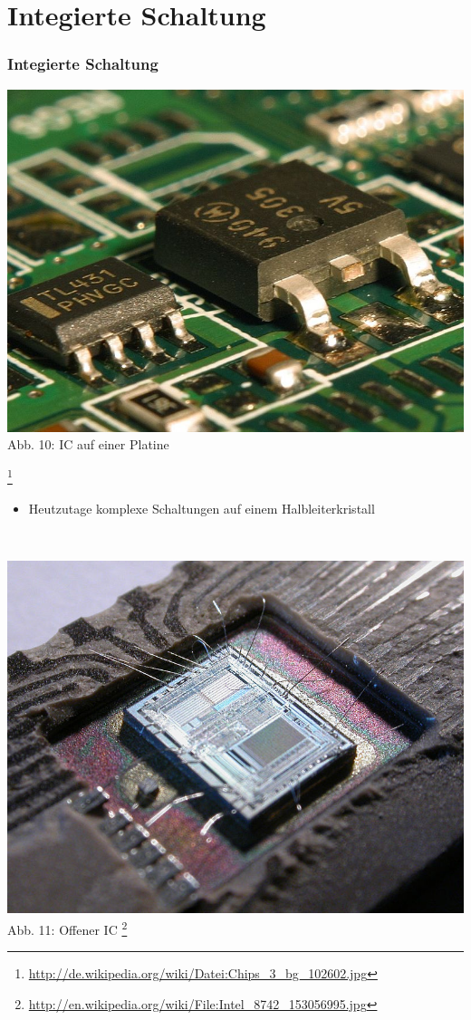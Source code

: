 \section*{Integierte Schaltung}
\begin{frame}
\frametitle{Integierte Schaltung}
\begin{minipage}{0.3\textwidth}
	\includegraphics[scale=0.15]{e13/IC.jpg}\\
	Abb. 10: IC auf einer Platine
\end{minipage}
\footnote{\url{http://de.wikipedia.org/wiki/Datei:Chips_3_bg_102602.jpg}}
\hspace{0.5cm}
\begin{minipage}{0.5\textwidth}
	\begin{itemize}
		\item Heutzutage komplexe Schaltungen auf einem Halbleiterkristall
	\end{itemize}
\end{minipage}\\
\vspace{0.5cm}
\begin{center}
\includegraphics[scale=0.4 ]{e13/IC2.jpg}\\
	Abb. 11: Offener IC
	\footnote{\url{http://en.wikipedia.org/wiki/File:Intel_8742_153056995.jpg}}
\end{center}
\end{frame}

